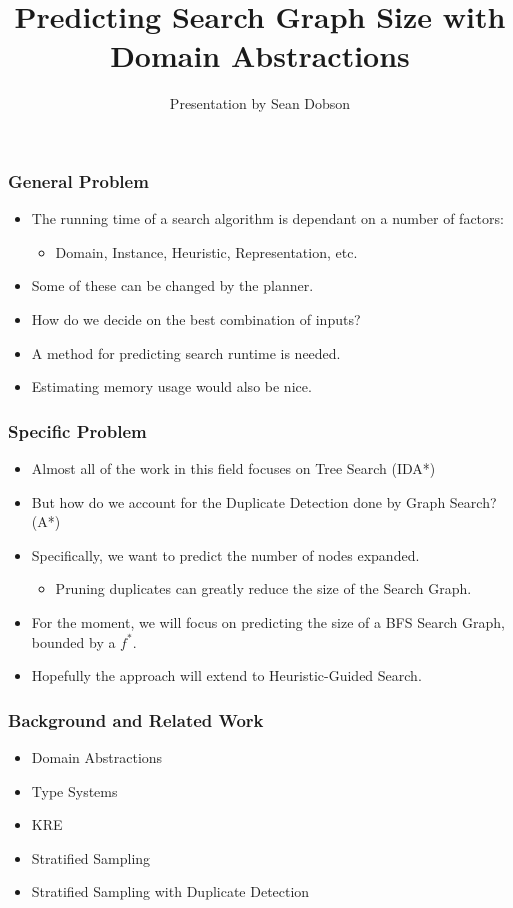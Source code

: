 \documentclass{beamer}
\begin{document}
\title{Predicting Search Graph Size with Domain Abstractions}
\author{Presentation by Sean Dobson}

\frame{\titlepage}

\begin{frame}
  \frametitle{General Problem}
  \begin{itemize}
  \item The running time of a search algorithm is dependant on a number of factors:
    \begin{itemize}
    \item Domain, Instance, Heuristic, Representation, etc.
    \end{itemize}
  \item Some of these can be changed by the planner.
  \item How do we decide on the best combination of inputs?
  \item A method for predicting search runtime is needed.
  \item Estimating memory usage would also be nice.
  \end{itemize}
\end{frame}

\begin{frame}
  \frametitle{Specific Problem}
  \begin{itemize}
  \item Almost all of the work in this field focuses on Tree Search (IDA*)
  \item But how do we account for the Duplicate Detection done by Graph Search? (A*)
  \item Specifically, we want to predict the number of nodes expanded.
    \begin{itemize}
    \item Pruning duplicates can greatly reduce the size of the Search Graph.
    \end{itemize}
  \item For the moment, we will focus on predicting the size of a BFS Search Graph,
    bounded by a \(f^*\).
  \item Hopefully the approach will extend to Heuristic-Guided Search.
  \end{itemize}
\end{frame}

\begin{frame}
  \frametitle{Background and Related Work}
  \begin{itemize}
  \item Domain Abstractions
  \item Type Systems
  \item KRE
  \item Stratified Sampling
  \item Stratified Sampling with Duplicate Detection
  \end{itemize}
\end{frame}
\end{document}
